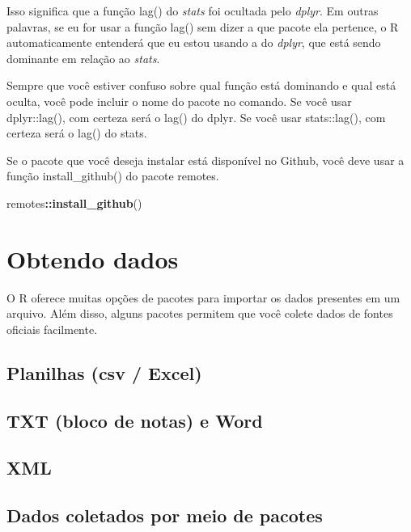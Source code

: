 \documentclass[
]{book}
\newenvironment{Shaded}{\begin{snugshade}}{\end{snugshade}}
\newcommand{\KeywordTok}[1]{\textcolor[rgb]{0.13,0.29,0.53}{\textbf{#1}}}
\newcommand{\NormalTok}[1]{#1}
\newcommand{\OperatorTok}[1]{\textcolor[rgb]{0.81,0.36,0.00}{\textbf{#1}}}
\begin{document}
Isso significa que a função lag() do \emph{stats} foi ocultada pelo \emph{dplyr}. Em outras palavras, se eu for usar a função lag() sem dizer a que pacote ela pertence, o R automaticamente entenderá que eu estou usando a do \emph{dplyr}, que está sendo dominante em relação ao \emph{stats}.

Sempre que você estiver confuso sobre qual função está dominando e qual está oculta, você pode incluir o nome do pacote no comando. Se você usar dplyr::lag(), com certeza será o lag() do dplyr. Se você usar stats::lag(), com certeza será o lag() do stats.

Se o pacote que você deseja instalar está disponível no Github, você deve usar a função install\_github() do pacote remotes.

\begin{Shaded}
\begin{Highlighting}[]
\NormalTok{remotes}\OperatorTok{::}\KeywordTok{install_github}\NormalTok{()}
\end{Highlighting}
\end{Shaded}

\hypertarget{obtendo-dados}{%
\chapter{Obtendo dados}\label{obtendo-dados}}

O R oferece muitas opções de pacotes para importar os dados presentes em um arquivo. Além disso, alguns pacotes permitem que você colete dados de fontes oficiais facilmente.

\hypertarget{planilhas-csv-excel}{%
\section{Planilhas (csv / Excel)}\label{planilhas-csv-excel}}

\hypertarget{txt-bloco-de-notas-e-word}{%
\section{TXT (bloco de notas) e Word}\label{txt-bloco-de-notas-e-word}}

\hypertarget{xml}{%
\section{XML}\label{xml}}

\hypertarget{dados-coletados-por-meio-de-pacotes}{%
\section{Dados coletados por meio de pacotes}\label{dados-coletados-por-meio-de-pacotes}}
\end{document}
